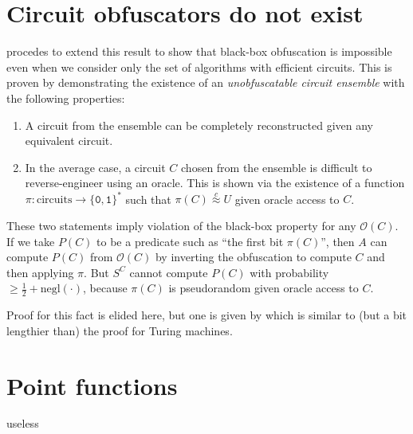 \documentclass[10pt,twocolumn]{article}
\def\zero{\texttt{0}}
\def\one{\texttt{1}}
\def\bit{{\ensuremath{\{\zero,\one\}}}}
\def\obf{\ensuremath{\mathcal{O}}}
\def\negl{\text{negl}}
\def\cind{{\ensuremath{\stackrel{c}{\approx}}}}
\begin{document}
    \section{Circuit obfuscators do not exist}

    \cite{onThe(Im)possibility} procedes to extend this result to show that black-box obfuscation is
    impossible even when we consider only the set of algorithms with efficient circuits.
    This is proven by demonstrating the existence of an \textit{unobfuscatable circuit ensemble}
    with the following properties:%

    \begin{enumerate}

      \item
        A circuit from the ensemble can be completely reconstructed given any equivalent circuit.

      \item
        In the average case, a circuit $C$ chosen from the ensemble is difficult to reverse-engineer using an oracle.
        This is shown via the existence of a function $\pi: \text{circuits}\to\bit^*$ such that $\pi(C)\cind U$
        given oracle access to $C$.

    \end{enumerate}

    These two statements imply violation of the black-box property for any $\obf(C)$.
    If we take $P(C)$ to be a predicate such as ``the first bit $\pi(C)$'',
    then $A$ can compute $P(C)$ from $\obf(C)$ by inverting the obfuscation to compute $C$ and then applying $\pi$.
    But $S^C$ cannot compute $P(C)$ with probability $\ge \frac{1}{2}+\negl(\cdot)$,
    because $\pi(C)$ is pseudorandom given oracle access to $C$.

    Proof for this fact is elided here, but one is given by \cite{onThe(Im)possibility}
    which is similar to (but a bit lengthier than) the proof for Turing machines.

  \section{Point functions}

    useless

  

  
\end{document}
